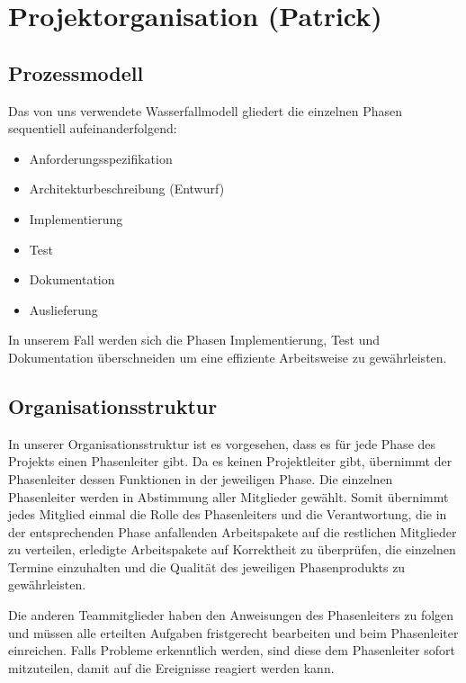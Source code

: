 \documentclass[fontsize=12pt,paper=a4,twoside]{scrartcl}
\begin{document}
\newpage

\section{Projektorganisation (Patrick)}

\subsection{Prozessmodell}
\label{sec:prozessmodell}

Das von uns verwendete Wasserfallmodell gliedert die einzelnen Phasen sequentiell aufeinanderfolgend:\\
\begin{itemize}

\item Anforderungsspezifikation
\item Architekturbeschreibung (Entwurf)
\item Implementierung
\item Test
\item Dokumentation
\item Auslieferung
\end{itemize}

In unserem Fall werden sich die Phasen Implementierung, Test und Dokumentation überschneiden um eine effiziente Arbeitsweise zu gewährleisten.

\subsection{Organisationsstruktur}
\label{sec:Orga}
In unserer Organisationsstruktur ist es vorgesehen, dass es für jede Phase des Projekts einen Phasenleiter gibt. Da es keinen Projektleiter gibt, übernimmt der Phasenleiter dessen Funktionen in der jeweiligen Phase. Die einzelnen Phasenleiter werden in Abstimmung aller Mitglieder gewählt. Somit übernimmt jedes Mitglied einmal die Rolle des Phasenleiters und die Verantwortung, die in der entsprechenden Phase anfallenden Arbeitspakete auf die restlichen Mitglieder zu verteilen, erledigte Arbeitspakete auf Korrektheit zu überprüfen, die einzelnen Termine einzuhalten und die Qualität des jeweiligen Phasenprodukts zu gewährleisten.

Die anderen Teammitglieder haben den Anweisungen des Phasenleiters zu folgen und müssen alle erteilten Aufgaben fristgerecht bearbeiten und beim Phasenleiter einreichen. Falls Probleme erkenntlich werden, sind diese dem Phasenleiter sofort mitzuteilen, damit auf die Ereignisse reagiert werden kann.
\end{document}
